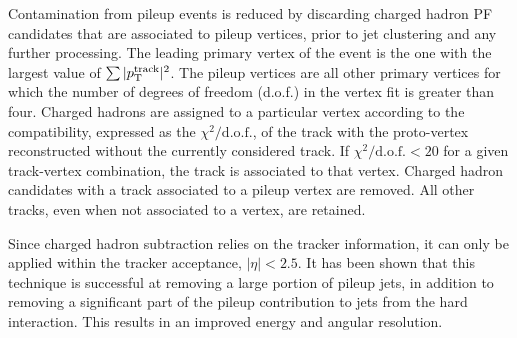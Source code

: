 Contamination from pileup events is reduced by discarding charged hadron PF candidates that are
associated to pileup vertices, prior to jet clustering and any further processing.   
The leading primary vertex of the event is the one with the largest value of $\sum
|p_{\mathrm{T}}^{\mathrm{track}}|^2$. The pileup vertices are all other primary vertices for which the number
of degrees of freedom (d.o.f.) in the vertex fit is greater than four. 
Charged hadrons are assigned to a particular vertex according to the compatibility, expressed as
the $\chi^2/\mathrm{d.o.f.}$, of the track with the proto-vertex reconstructed without the
currently considered track. If $\chi^2/\mathrm{d.o.f.}<20$ for a given track-vertex combination,
the track is associated to that vertex. 
Charged hadron candidates with a track associated to a pileup vertex are removed. All other tracks,
even when not associated to a vertex, are retained. 

Since charged hadron subtraction relies on the tracker information, it can only be applied within
the tracker acceptance, $|\eta| < 2.5$. It has been shown that this technique is successful at
removing a large portion of pileup jets, in addition to removing a significant part of the pileup
contribution to jets from the hard interaction. This results in an improved energy and angular
resolution. 



